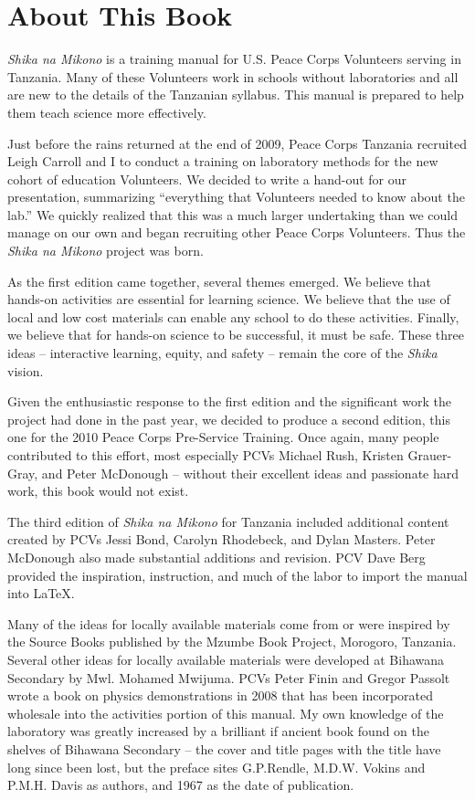 \clearpage
{}
{}
\chapter*{About This Book}

\emph{Shika na Mikono} is a training manual for U.S. Peace Corps Volunteers serving in Tanzania. Many of these Volunteers work in schools without laboratories and all are new to the details of the Tanzanian syllabus. This manual is prepared to help them teach science more effectively.

Just before the rains returned at the end of 2009, 
Peace Corps Tanzania recruited Leigh Carroll and I 
to conduct a training on laboratory methods 
for the new cohort of education Volunteers. 
We decided to write a hand-out for our presentation, 
summarizing ``everything that Volunteers needed to know about the lab.'' 
We quickly realized that this was a much larger undertaking 
than we could manage on our own 
and began recruiting other Peace Corps Volunteers. 
Thus the \emph{Shika na Mikono} project was born.

As the first edition came together, several themes emerged. 
We believe that hands-on activities are essential for learning science. 
We believe that the use of local and low cost materials 
can enable any school to do these activities. 
Finally, we believe that for hands-on science to be successful, 
it must be safe. 
These three ideas -- interactive learning, equity, and safety -- 
remain the core of the \emph{Shika} vision.

Given the enthusiastic response to the first edition 
and the significant work the project had done in the past year, 
we decided to produce a second edition, 
this one for the 2010 Peace Corps Pre-Service Training. 
Once again, many people contributed to this effort, 
most especially PCVs Michael Rush, Kristen Grauer-Gray, and Peter McDonough 
-- without their excellent ideas and passionate hard work, 
this book would not exist.

The third edition of \emph{Shika na Mikono} for Tanzania included additional content created by
PCVs Jessi Bond, Carolyn Rhodebeck, and Dylan Masters. Peter McDonough 
also made substantial additions and revision. 
PCV Dave Berg provided the inspiration, instruction, 
and much of the labor to import the manual into \LaTeX.

Many of the ideas for locally available materials 
come from or were inspired by the Source Books 
published by the Mzumbe Book Project, Morogoro, Tanzania. 
Several other ideas for locally available materials 
were developed at Bihawana Secondary by Mwl. Mohamed Mwijuma. 
PCVs Peter Finin and Gregor Passolt wrote 
a book on physics demonstrations in 2008 
that has been incorporated wholesale 
into the activities portion of this manual. 
My own knowledge of the laboratory was greatly increased 
by a brilliant if ancient book found on the shelves of Bihawana Secondary -- 
the cover and title pages with the title have long since been lost, 
but the preface sites G.P.Rendle, M.D.W. Vokins and P.M.H. Davis as authors, 
and 1967 as the date of publication.

